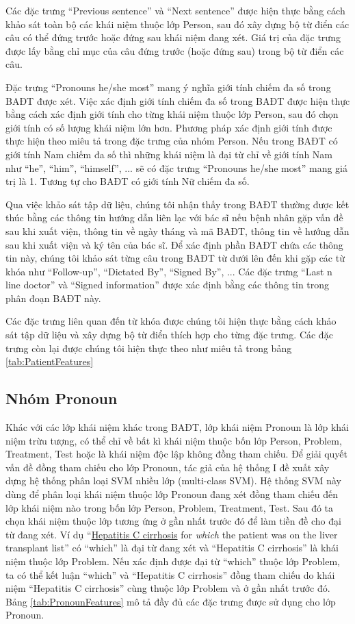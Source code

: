 Các đặc trưng ``Previous sentence'' và ``Next sentence'' được hiện thực bằng cách khảo sát toàn bộ các khái niệm thuộc lớp Person, sau đó xây dựng bộ từ điển các câu có thể đứng trước hoặc đứng sau khái niệm đang xét. Giá trị của đặc trưng được lấy bằng chỉ mục của câu đứng trước (hoặc đứng sau) trong bộ từ điển các câu.

Đặc trưng ``Pronouns he/she most'' mang ý nghĩa giới tính chiếm đa số trong BAĐT được xét. Việc xác định giới tính chiếm đa số trong BAĐT được hiện thực bằng cách xác định giới tính cho từng khái niệm thuộc lớp Person, sau đó chọn giới tính có số lượng khái niệm lớn hơn. Phương pháp xác định giới tính được thực hiện theo miêu tả trong đặc trưng của nhóm Person. Nếu trong BAĐT có giới tính Nam chiếm đa số thì những khái niệm là đại từ chỉ về giới tính Nam như ``he'', ``him'', ``himself'', ... sẽ có đặc trưng ``Pronouns he/she most'' mang giá trị là 1. Tương tự cho BAĐT có giới tính Nữ chiếm đa số.

Qua việc khảo sát tập dữ liệu, chúng tôi nhận thấy trong BAĐT thường được kết thúc bằng các thông tin hướng dẫn liên lạc với bác sĩ nếu bệnh nhân gặp vấn đề sau khi xuất viện, thông tin về ngày tháng và mã BAĐT, thông tin về hướng dẫn sau khi xuất viện và ký tên của bác sĩ. Để xác định phần BAĐT chứa các thông tin này, chúng tôi khảo sát từng câu trong BAĐT từ dưới lên đến khi gặp các từ khóa như ``Follow-up'', ``Dictated By'', ``Signed By'', ... Các đặc trưng ``Last n line doctor'' và ``Signed information'' được xác định bằng các thông tin trong phân đoạn BAĐT này.

Các đặc trưng liên quan đến từ khóa được chúng tôi hiện thực bằng cách khảo sát tập dữ liệu và xây dựng bộ từ điển thích hợp cho từng đặc trưng. Các đặc trưng còn lại được chúng tôi hiện thực theo như miêu tả trong bảng \ref{tab:PatientFeatures}

\subsection*{Nhóm Pronoun}
Khác với các lớp khái niệm khác trong BAĐT, lớp khái niệm Pronoun là lớp khái niệm trừu tượng, có thể chỉ về bất kì khái niệm thuộc bốn lớp Person, Problem, Treatment, Test hoặc là khái niệm độc lập không đồng tham chiếu. Để giải quyết vấn đề đồng tham chiếu cho lớp Pronoun, tác giả của hệ thống I đề xuất xây dựng hệ thống phân loại SVM nhiều lớp (multi-class SVM). Hệ thống SVM này dùng để phân loại khái niệm thuộc lớp Pronoun đang xét đồng tham chiếu đến lớp khái niệm nào trong bốn lớp Person, Problem, Treatment, Test. Sau đó ta chọn khái niệm thuộc lớp tương ứng ở gần nhất trước đó để làm tiền đề cho đại từ đang xét. Ví dụ ``\underline{Hepatitis C cirrhosis} for \textit{which} the patient was on the liver transplant list'' có ``which'' là đại từ đang xét và ``Hepatitis C cirrhosis'' là khái niệm thuộc lớp Problem. Nếu xác định được đại từ ``which'' thuộc lớp Problem, ta có thể kết luận ``which'' và ``Hepatitis C cirrhosis'' đồng tham chiếu do khái niệm ``Hepatitis C cirrhosis'' cùng thuộc lớp Problem và ở gần nhất trước đó. Bảng \ref{tab:PronounFeatures} mô tả đầy đủ các đặc trưng được sử dụng cho lớp Pronoun.

